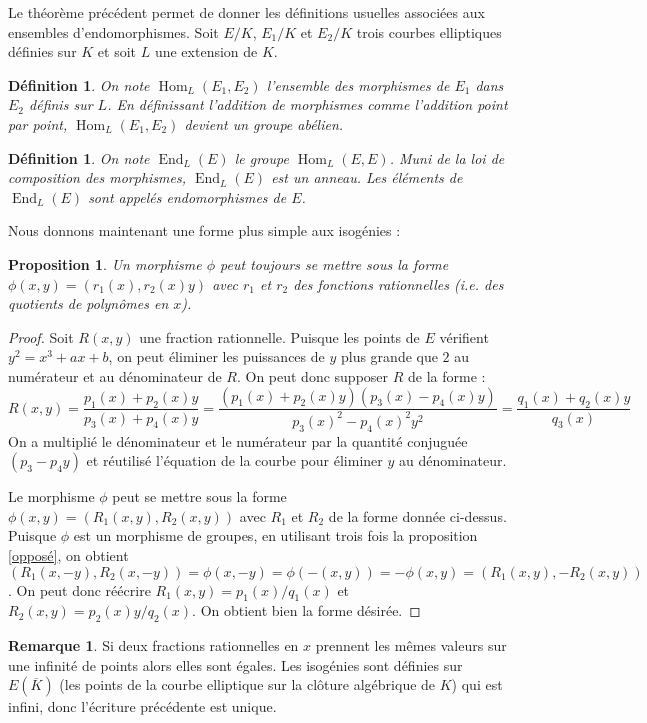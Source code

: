 \documentclass{article}
\theoremstyle{plain}%
\newtheorem{prop}[thm]{Proposition}
\newtheorem{deff}[thm]{Définition}
\theoremstyle{definition}%
\newtheorem{rem}[thm]{Remarque}
\DeclareMathOperator{\End}{End}
\DeclareMathOperator{\Hom}{Hom}
\begin{document}
Le théorème précédent permet de donner les définitions usuelles associées aux ensembles d'endomorphismes. Soit $E/K$, $E_1/K$ et $E_2/K$ trois courbes elliptiques définies sur $K$ et soit $L$ une extension de $K$.

\begin{deff}
  On note $\Hom_L(E_1, E_2)$ l'ensemble des morphismes de $E_1$ dans $E_2$ définis sur $L$. En définissant l'addition de morphismes comme l'addition point par point, $\Hom_L(E_1, E_2)$ devient un groupe abélien.
\end{deff}

\begin{deff}
  On note $\End_L(E)$ le groupe $\Hom_L(E, E)$. Muni de la loi de composition des morphismes, $\End_L(E)$ est un anneau. Les éléments de $\End_L(E)$ sont appelés endomorphismes de $E$.
\end{deff}


 Nous donnons maintenant une forme plus simple aux isogénies :


\begin{prop}
  Un morphisme $\phi$ peut toujours se mettre sous la forme $\phi(x, y) = (r_1(x), r_2(x)y)$ avec $r_1$ et $r_2$ des fonctions rationnelles (i.e. des quotients de polynômes en $x$).
\end{prop}

\begin{proof}
  Soit $R(x, y)$ une fraction rationnelle. Puisque les points de $E$ vérifient $y^2 = x^3 + ax + b$, on peut éliminer les puissances de $y$ plus grande que $2$ au numérateur et au dénominateur de $R$. On peut donc supposer $R$ de la forme : $$R(x, y) = \frac{p_1(x) + p_2(x)y}{p_3(x)+p_4(x)y} = \frac{(p_1(x) + p_2(x)y)(p_3(x)-p_4(x)y)}{p_3(x)^2 - p_4(x)^2y^2} = \frac{q_1(x) +q_2(x)y}{q_3(x)} $$
 On a multiplié le dénominateur et le numérateur par la quantité conjuguée $(p_3-p_4y)$ et réutilisé l'équation de la courbe pour éliminer $y$ au dénominateur.

 Le morphisme $\phi$ peut se mettre sous la forme $\phi(x, y) = (R_1(x, y), R_2(x, y))$ avec $R_1$ et $R_2$ de la forme donnée ci-dessus. Puisque $\phi$ est un morphisme de groupes, en utilisant trois fois la proposition \ref{opposé}, on obtient
 $(R_1(x, -y), R_2(x, -y)) = \phi(x, -y) = \phi(-(x, y)) = -\phi(x, y) = (R_1(x, y), -R_2(x, y))$. On peut donc réécrire $R_1(x, y) = p_1(x) / q_1(x)$ et $R_2(x, y) = p_2(x)y/q_2(x)$. On obtient bien la forme désirée.
\end{proof}

\begin{rem}
  Si deux fractions rationnelles en $x$ prennent les mêmes valeurs sur une infinité de points alors elles sont égales. Les isogénies sont définies sur $E(\overline{K})$ (les points de la courbe elliptique sur la clôture algébrique de $K$) qui est infini, donc l'écriture précédente est unique.
\end{rem}
\end{document}
